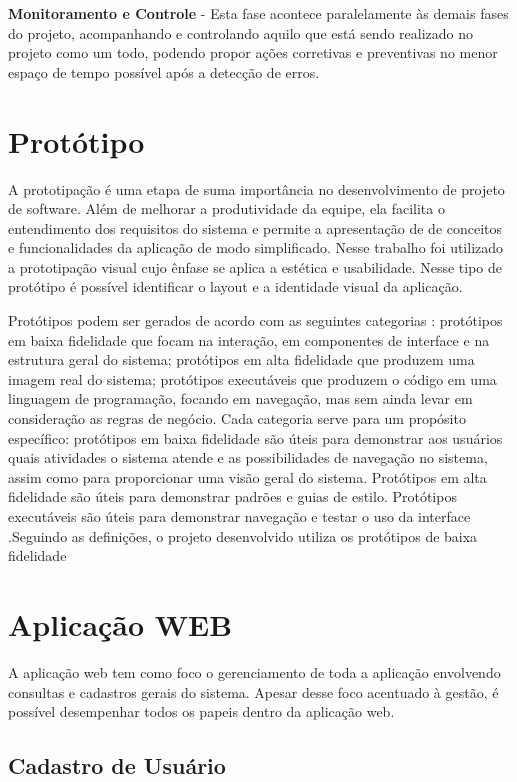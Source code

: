 {\textbf{Monitoramento e Controle} - Esta fase acontece paralelamente às demais fases do projeto, acompanhando e controlando aquilo que está sendo realizado no projeto como um todo, podendo propor ações corretivas e preventivas no menor espaço de tempo possível após a detecção de erros.}


\section{Protótipo}

A prototipação é uma etapa de suma importância no desenvolvimento de projeto de software. Além de melhorar a produtividade da equipe, ela facilita o entendimento dos requisitos do sistema e permite a apresentação de de conceitos e funcionalidades da aplicação de modo simplificado.
Nesse trabalho foi utilizado a prototipação visual cujo ênfase se aplica a estética e usabilidade. Nesse tipo de protótipo é possível identificar o layout e a identidade visual da aplicação. \cite{dextra2013prototipacao}

{Protótipos podem ser gerados de acordo com as seguintes categorias \cite{coyette2004sketchixml}: protótipos em baixa fidelidade que focam na interação, em componentes de interface e na estrutura geral do sistema; protótipos em alta fidelidade que produzem uma imagem real do sistema; protótipos executáveis que produzem o código em uma linguagem de programação, focando em navegação, mas sem ainda levar em consideração as regras de negócio. Cada categoria serve para um propósito específico: protótipos em baixa fidelidade são úteis para demonstrar aos usuários quais atividades o sistema atende e as possibilidades de navegação no sistema, assim como para proporcionar uma visão geral do sistema. Protótipos em alta fidelidade são úteis para demonstrar padrões e guias de estilo. Protótipos executáveis são úteis para demonstrar navegação e testar o uso da interface \cite{rosemberg2008prototipaccao}.Seguindo as definições, o projeto desenvolvido utiliza os protótipos de baixa fidelidade}

\section{Aplicação WEB}
A aplicação web tem como foco o gerenciamento de toda a aplicação envolvendo consultas e cadastros gerais do sistema.
Apesar desse foco acentuado à gestão, é possível desempenhar todos os papeis dentro da aplicação web.

\subsection{Cadastro de Usuário}

